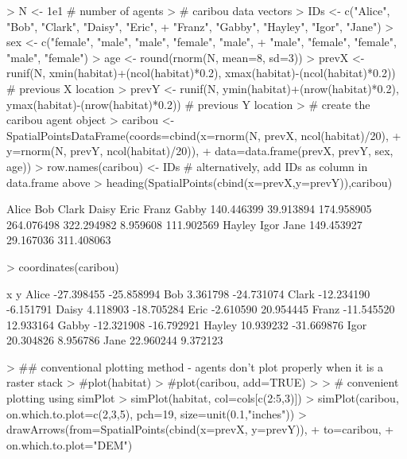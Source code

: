\documentclass{article}
\begin{document}
\begin{Schunk}
\begin{Sinput}
> N <- 1e1 # number of agents
> # caribou data vectors
> IDs <- c("Alice", "Bob", "Clark", "Daisy", "Eric",
+          "Franz", "Gabby", "Hayley", "Igor", "Jane")
> sex <- c("female", "male", "male", "female", "male",
+          "male", "female", "female", "male", "female")
> age <- round(rnorm(N, mean=8, sd=3))
> prevX <- runif(N, xmin(habitat)+(ncol(habitat)*0.2), xmax(habitat)-(ncol(habitat)*0.2)) # previous X location
> prevY <- runif(N, ymin(habitat)+(nrow(habitat)*0.2), ymax(habitat)-(nrow(habitat)*0.2)) # previous Y location
> # create the caribou agent object
> caribou <- SpatialPointsDataFrame(coords=cbind(x=rnorm(N, prevX, ncol(habitat)/20),
+                                                y=rnorm(N, prevY, ncol(habitat)/20)),
+                                   data=data.frame(prevX, prevY, sex, age))
> row.names(caribou) <- IDs # alternatively, add IDs as column in data.frame above
> heading(SpatialPoints(cbind(x=prevX,y=prevY)),caribou)
\end{Sinput}
\begin{Soutput}
     Alice        Bob      Clark      Daisy       Eric      Franz      Gabby 
140.446399  39.913894 174.958905 264.076498 322.294982   8.959608 111.902569 
    Hayley       Igor       Jane 
149.453927  29.167036 311.408063 
\end{Soutput}
\begin{Sinput}
> coordinates(caribou)
\end{Sinput}
\begin{Soutput}
                x          y
Alice  -27.398455 -25.858994
Bob      3.361798 -24.731074
Clark  -12.234190  -6.151791
Daisy    4.118903 -18.705284
Eric    -2.610590  20.954445
Franz  -11.545520  12.933164
Gabby  -12.321908 -16.792921
Hayley  10.939232 -31.669876
Igor    20.304826   8.956786
Jane    22.960244   9.372123
\end{Soutput}
\begin{Sinput}
> ## conventional plotting method - agents don't plot properly when it is a raster stack
> #plot(habitat)
> #plot(caribou, add=TRUE)
> 
> # convenient plotting using simPlot
> simPlot(habitat, col=cols[c(2:5,3)])
> simPlot(caribou, on.which.to.plot=c(2,3,5), pch=19, size=unit(0.1,"inches"))
> drawArrows(from=SpatialPoints(cbind(x=prevX, y=prevY)),
+            to=caribou,
+            on.which.to.plot="DEM")
\end{Sinput}
\end{Schunk}
\end{document}
